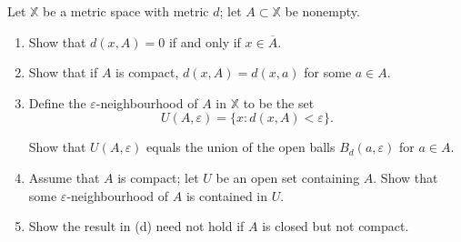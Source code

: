 \documentclass[a4paper,12pt, reqno]{article}
\theoremstyle{definition}
\newenvironment{exerr}[1]{
  \renewcommand\theexeralt{#1}
  \exeralt
}{\endexeralt}
\newcommand{\X}{\mathbb{X}}
\begin{document}
\begin{exerr}{2}
  Let $\X$ be a metric space with metric $d$; let $A\subset\X$ be nonempty.
  \begin{enumerate}[label=(\alph*)]
    \item Show that $d(x,A)=0$ if and only if $x\in \overline{A}$.
    \item Show that if $A$ is compact, $d(x,A) = d(x,a)$ for some $a\in A$.
    \item Define the $\varepsilon$-neighbourhood of $A$ in $\X$ to be the set
    \begin{equation*}
        U(A,\varepsilon) = \{ x : d(x,A)<\varepsilon \}.
    \end{equation*}

    Show that $U(A,\varepsilon)$ equals the union of the open balls $B_{d}(a,\varepsilon)$ for $a\in A$.
    \item Assume that $A$ is compact; let $U$ be an open set containing $A$. Show that some $\varepsilon$-neighbourhood of $A$ is contained in $U$.
    \item Show the result in (d) need not hold if $A$ is closed but not compact.
  \end{enumerate}
\end{exerr}
\end{document}
